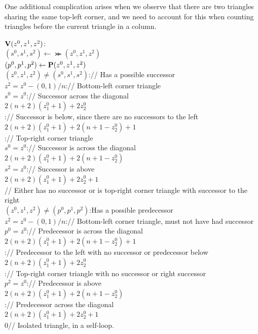 One additional complication arises when we observe that there are two triangles sharing the same top-left corner, and we need to account for this when counting triangles before the current triangle in a column. 
  \begin{algo}
    $\mathbf{V}(z^0,z^1,z^2)$:\+
    \\  $(s^0,s^1,s^2) \gets \Succ(z^0,z^1,z^2)$
    \\  $(p^0,p^1,p^2) \gets \mathbf{P}(z^0,z^1,z^2)$
    \\  \IfB $(z^0,z^1,z^2) \neq (s^0,s^1,s^2)$:\quad // Has a possible successor\+
    \\    \IfB $z^2 = z^0 - (0,1)/n$:\quad // Bottom-left corner triangle\+
    \\      \IfB $s^0 = z^0$:\quad // Successor across the diagonal\+
    \\        \ReturnB $2(n+2)(z^0_1 + 1) + 2z^0_2$\-
    \\      \ElseB:\quad // Successor is below, since there are no successors to the left\+
    \\        \ReturnB $2(n+2)(z^0_1 + 1) + 2(n+1-z^0_2) + 1$\-\-
    \\    \ElseB:\quad // Top-right corner triangle\+
    \\      \IfB $s^0 = z^0$:\quad // Successor is across the diagonal\+
    \\        \ReturnB $2(n+2)(z^0_1 + 1) + 2(n+1-z^0_2)$\-
    \\      \ElseIfB $s^2 = z^0$:\quad // Successor is above\+
    \\        \ReturnB $2(n+2)(z^0_1 + 1) + 2z^0_2 + 1$\-\-\-
    \\  // Either has no successor or is top-right corner triangle with successor to the right
    \\  \IfB $(z^0,z^1,z^2) \neq (p^0,p^1,p^2)$:\quad Has a possible predecessor\+
    \\    \IfB $z^2 = z^0 - (0,1)/n$:\quad // Bottom-left corner triangle, must not have had successor\+
    \\      \IfB $p^0 = z^0$:\quad // Predecessor is across the diagonal\+
    \\        \ReturnB $2(n+2)(z^0_1 + 1) + 2(n+1-z^0_2) + 1$\-
    \\      \ElseB:\quad // Predecessor to the left with no successor or predecessor below\+
    \\        \ReturnB $2(n+2)(z^0_1 + 1) + 2z^0_2$\-\-
    \\    \ElseB:\quad // Top-right corner triangle with no successor or right successor\+
    \\      \IfB $p^2 = z^0$:\quad // Predecessor is above\+
    \\        \ReturnB $2(n+2)(z^0_1 + 1) + 2(n+1-z^0_2)$\-
    \\      \ElseB:\quad // Predecessor across the diagonal\+
    \\        \ReturnB $2(n+2)(z^0_1 + 1) + 2z^0_2 + 1$\-\-\-
    \\  \ReturnB $0$\quad // Isolated triangle, in a self-loop. 
  \end{algo}

